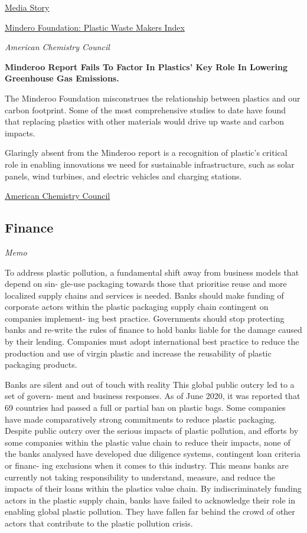 \documentclass[
]{book}
\begin{document}
\href{https://sourceofplasticwaste.org/}{Media Story}

\href{https://www.minderoo.org/plastic-waste-makers-index/findings/executive-summary/}{Mindero Foundation: Plastic Waste Makers Index}

\emph{American Chemistry Council}

\textbf{Minderoo Report Fails To Factor In Plastics' Key Role In Lowering Greenhouse Gas Emissions.}

The Minderoo Foundation misconstrues the relationship between plastics and our carbon footprint. Some of the most comprehensive studies to date have found that replacing plastics with other materials would drive up waste and carbon impacts.

Glaringly absent from the Minderoo report is a recognition of plastic's critical role in enabling innovations we need for sustainable infrastructure, such as solar panels, wind turbines, and electric vehicles and charging stations.

\href{https://www.prnewswire.com/news-releases/misleading-minderoo-report-fails-to-factor-in-plastics-key-role-in-lowering-greenhouse-gas-emissions-301293161.html}{American Chemistry Council}

\hypertarget{finance}{%
\subsection{Finance}\label{finance}}

\emph{Memo}

To address plastic pollution, a fundamental shift
away from business models that depend on sin-
gle-use packaging towards those that prioritise
reuse and more localized supply chains and services
is needed.
Banks should make funding of corporate
actors within the plastic packaging supply
chain contingent on companies implement-
ing best practice.
Governments should stop protecting banks
and re-write the rules of finance to hold
banks liable for the damage caused by their
lending.
Companies must adopt international best
practice to reduce the production and use
of virgin plastic and increase the reusability
of plastic packaging products.

Banks are silent and out of touch
with reality
This global public outcry led to a set of govern-
ment and business responses. As of June 2020, it
was reported that 69 countries had passed a full or
partial ban on plastic bags. Some companies have
made comparatively strong commitments to reduce
plastic packaging. Despite public outcry over the serious impacts
of plastic pollution, and efforts by some companies
within the plastic value chain to reduce their impacts,
none of the banks analysed have developed due
diligence systems, contingent loan criteria or financ-
ing exclusions when it comes to this industry. This
means banks are currently not taking responsibility
to understand, measure, and reduce the impacts of
their loans within the plastics value chain.
By indiscriminately funding actors in the plastic
supply chain, banks have failed to acknowledge
their role in enabling global plastic pollution. They
have fallen far behind the crowd of other actors that
contribute to the plastic pollution crisis.
\end{document}
